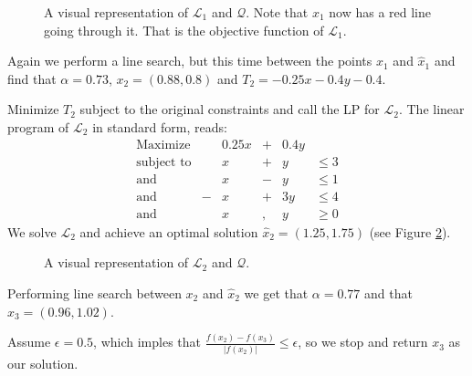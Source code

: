\begin{figure}[h!]
\centering

\caption{A visual representation of $\mathcal{L}_1$ and $\mathcal{Q}$.
         Note that $x_1$ now has a red line going through it. That is
         the objective function of $\mathcal{L}_1$.}
\label{fig:lp2}
\end{figure}

Again we perform a line search, but this time between the points $x_1$ and
$\hat{x}_1$ and find that $\alpha = 0.73$, $x_2 = (0.88, 0.8)$ and
$T_2 = -0.25x -0.4y -0.4$.

Minimize $T_2$ subject to the original constraints and call the LP for
$\mathcal{L}_2$.
The linear program of $\mathcal{L}_2$ in standard form, reads:
\[
\begin{array}{lcrcrl}
    \textrm{Maximize}   & & 0.25 x &+& 0.4 y & \\
    \textrm{subject to} & &      x &+&     y & \leq 3 \\
    \textrm{and}        & &      x &-&     y & \leq 1 \\
    \textrm{and}        &-&      x &+&   3 y & \leq 4 \\
    \textrm{and}        & &      x &,&     y & \geq 0
\end{array}
\]
We solve $\mathcal{L}_2$ and achieve an optimal solution $\hat{x}_2
= (1.25, 1.75)$ (see Figure \ref{fig:lp3}).
\begin{figure}[h!]
\centering

\caption{A visual representation of $\mathcal{L}_2$ and $\mathcal{Q}$.}
\label{fig:lp3}
\end{figure}

Performing line search between $x_2$ and $\hat{x}_2$ we get that
$\alpha = 0.77$ and that $x_3 = (0.96, 1.02)$.


Assume $\epsilon = 0.5$, which imples that
$\frac{f(x_2) - f(x_3)}{|f(x_2)|} \leq \epsilon$, so we stop and return $x_3$
as our solution.
